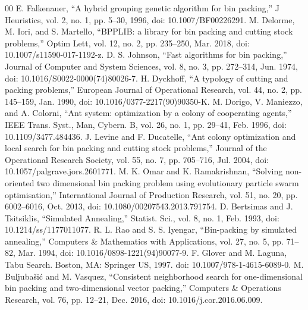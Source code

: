 \documentclass[conference]{IEEEtran}
\begin{document}
\begin{thebibliography}{00}
     E. Falkenauer, ``A hybrid grouping genetic algorithm for bin packing,'' J Heuristics, vol. 2, no. 1, pp. 5–30, 1996, doi: 10.1007/BF00226291.
     M. Delorme, M. Iori, and S. Martello, ``BPPLIB: a library for bin packing and cutting stock problems,'' Optim Lett, vol. 12, no. 2, pp. 235–250, Mar. 2018, doi: 10.1007/s11590-017-1192-z.
     D. S. Johnson, ``Fast algorithms for bin packing,'' Journal of Computer and System Sciences, vol. 8, no. 3, pp. 272–314, Jun. 1974, doi: 10.1016/S0022-0000(74)80026-7.
     H. Dyckhoff, ``A typology of cutting and packing problems,'' European Journal of Operational Research, vol. 44, no. 2, pp. 145–159, Jan. 1990, doi: 10.1016/0377-2217(90)90350-K.
     M. Dorigo, V. Maniezzo, and A. Colorni, ``Ant system: optimization by a colony of cooperating agents,'' IEEE Trans. Syst., Man, Cybern. B, vol. 26, no. 1, pp. 29–41, Feb. 1996, doi: 10.1109/3477.484436.
     J. Levine and F. Ducatelle, ``Ant colony optimization and local search for bin packing and cutting stock problems,'' Journal of the Operational Research Society, vol. 55, no. 7, pp. 705–716, Jul. 2004, doi: 10.1057/palgrave.jors.2601771.
     M. K. Omar and K. Ramakrishnan, ``Solving non-oriented two dimensional bin packing problem using evolutionary particle swarm optimisation,'' International Journal of Production Research, vol. 51, no. 20, pp. 6002–6016, Oct. 2013, doi: 10.1080/00207543.2013.791754.
     D. Bertsimas and J. Tsitsiklis, ``Simulated Annealing,'' Statist. Sci., vol. 8, no. 1, Feb. 1993, doi: 10.1214/ss/1177011077.
     R. L. Rao and S. S. Iyengar, ``Bin-packing by simulated annealing,'' Computers \& Mathematics with Applications, vol. 27, no. 5, pp. 71–82, Mar. 1994, doi: 10.1016/0898-1221(94)90077-9.
     F. Glover and M. Laguna, Tabu Search. Boston, MA: Springer US, 1997. doi: 10.1007/978-1-4615-6089-0.
     M. Buljubašić and M. Vasquez, ``Consistent neighborhood search for one-dimensional bin packing and two-dimensional vector packing,'' Computers \& Operations Research, vol. 76, pp. 12–21, Dec. 2016, doi: 10.1016/j.cor.2016.06.009.
\end{thebibliography}
\end{document}
